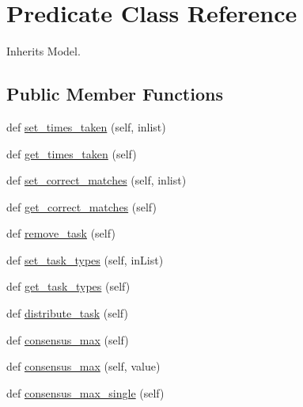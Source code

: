 \hypertarget{classdynamicfilterapp_1_1models_1_1_predicate}{}\section{Predicate Class Reference}
\label{classdynamicfilterapp_1_1models_1_1_predicate}


Inherits Model.

\subsection*{Public Member Functions}
\begin{DoxyCompactItemize}
\item 
def \hyperlink{classdynamicfilterapp_1_1models_1_1_predicate_a4adcbbe0cf32ef383818ee9043e61628}{set\+\_\+times\+\_\+taken} (self, inlist)
\item 
def \hyperlink{classdynamicfilterapp_1_1models_1_1_predicate_aeb336756b1c72d57020a7b9f968b763e}{get\+\_\+times\+\_\+taken} (self)
\item 
def \hyperlink{classdynamicfilterapp_1_1models_1_1_predicate_a1e690d6df7dc40428d200ce0494eb72a}{set\+\_\+correct\+\_\+matches} (self, inlist)
\item 
def \hyperlink{classdynamicfilterapp_1_1models_1_1_predicate_ac0edbf94b370ed541539c84ecfede353}{get\+\_\+correct\+\_\+matches} (self)
\item 
def \hyperlink{classdynamicfilterapp_1_1models_1_1_predicate_a88c991de34eb29936f716526d4b7f86d}{remove\+\_\+task} (self)
\item 
def \hyperlink{classdynamicfilterapp_1_1models_1_1_predicate_a8883240ed027ae492e788dc7a24ef227}{set\+\_\+task\+\_\+types} (self, in\+List)
\item 
def \hyperlink{classdynamicfilterapp_1_1models_1_1_predicate_ab5ba298be003142db12f57fa67c40a66}{get\+\_\+task\+\_\+types} (self)
\item 
def \hyperlink{classdynamicfilterapp_1_1models_1_1_predicate_a2222560950a1e6f6b3a67c30d802c16e}{distribute\+\_\+task} (self)
\item 
def \hyperlink{classdynamicfilterapp_1_1models_1_1_predicate_a041df75dd2354ebd0b4802adfc96993e}{consensus\+\_\+max} (self)
\item 
def \hyperlink{classdynamicfilterapp_1_1models_1_1_predicate_ad8419218db77659995b89d783709d0f5}{consensus\+\_\+max} (self, value)
\item 
def \hyperlink{classdynamicfilterapp_1_1models_1_1_predicate_abcab4ef70d7f8b63e70922755fa2daf8}{consensus\+\_\+max\+\_\+single} (self)

\end{DoxyCompactItemize}
